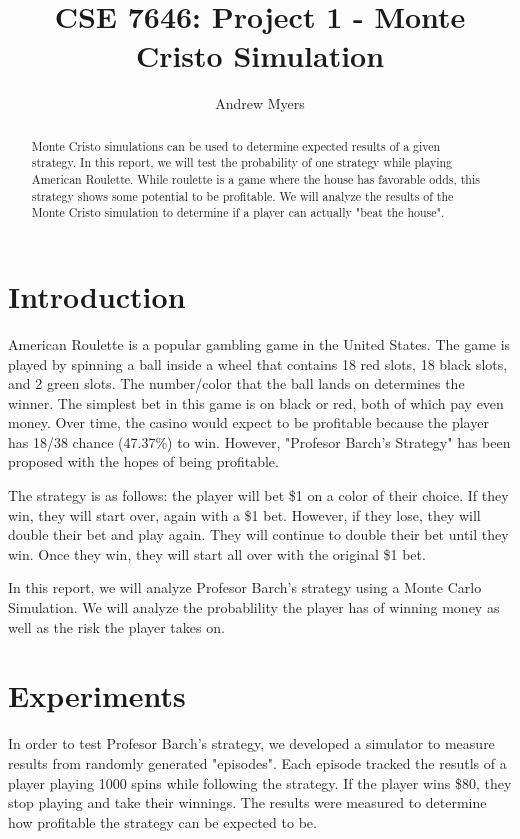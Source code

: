 \documentclass[
	letterpaper, %
]{jdf}
\author{Andrew Myers}
\title{CSE 7646: Project 1 - Monte Cristo Simulation}
\begin{document}

\maketitle

\begin{abstract}
Monte Cristo simulations can be used to determine expected results of a given strategy.
In this report, we will test the probability of one strategy while playing American Roulette.
While roulette is a game where the house has favorable odds, this strategy shows some potential to be profitable.
We will analyze the results of the Monte Cristo simulation to determine if a player can actually "beat the house".
\end{abstract}

\section{Introduction}
American Roulette is a popular gambling game in the United States. The game is played by spinning a ball inside a wheel that contains 18
red slots, 18 black slots, and 2 green slots. The number/color that the ball lands on determines the winner. The simplest bet in this game is 
on black or red, both of which pay even money. 
Over time, the casino would expect to be profitable because the player has 18/38 chance (47.37\%) to win. 
However, "Profesor Barch's Strategy" has been proposed with the hopes of being profitable.

The strategy is as follows: the player will bet \$1 on a color of their choice. If they win, they will start over, again with a \$1 bet. 
However, if they lose, they will double their bet and play again. They will continue to double their bet until they win. Once they win,
they will start all over with the original \$1 bet.

In this report, we will analyze Profesor Barch's strategy using a Monte Carlo Simulation. We will analyze the probablility the player has of winning
money as well as the risk the player takes on.

\section{Experiments}
In order to test Profesor Barch's strategy, we developed a simulator to measure results from randomly generated "episodes".
Each episode tracked the resutls of a player playing 1000 spins while following the strategy.
If the player wins \$80, they stop playing and take their winnings.
The results were measured to determine how profitable the strategy can be expected to be.
\end{document}

